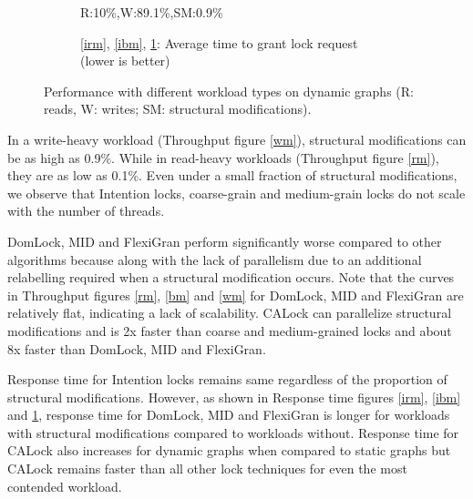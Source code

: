 \begin{figure}[h]
\begin{subfigure}[b]{.325\textwidth}
			\caption{R:10\%,W:89.1\%,SM:0.9\%}
			\label{iwm}
		\end{subfigure}
		\begin{subfigure}[b]{\textwidth}
			\caption*{\ref{irm}, \ref{ibm}, \ref{iwm}: Average time to grant lock request  (lower is better)}
		\end{subfigure}
	
		\caption{Performance with different workload types on dynamic graphs  (R: reads, W: writes; SM: structural modifications).}
		\label{dynamicPerf}
	\end{figure}

In a write-heavy workload (Throughput figure \ref{wm}), structural modifications can be as high as 0.9\%. 
While in read-heavy workloads (Throughput figure \ref{rm}), they are as low as 0.1\%.
Even under a small fraction of structural modifications, we observe that Intention locks, coarse-grain and medium-grain locks do not scale with the number of threads. 

	
DomLock, MID and FlexiGran perform significantly worse compared to other algorithms because along with the lack of parallelism due to an additional relabelling required when a structural modification occurs.
Note that the curves in Throughput figures \ref{rm}, \ref{bm} and \ref{wm} for DomLock, MID and FlexiGran are relatively flat, indicating a lack of scalability. CALock can parallelize structural modifications and is 2x faster than coarse and medium-grained locks and about 8x faster than DomLock, MID and FlexiGran.

Response time for Intention locks remains same regardless of the proportion of structural modifications. However, as shown in Response time figures \ref{irm}, \ref{ibm} and \ref{iwm}, response time for DomLock, MID and FlexiGran is longer for workloads with structural modifications compared to workloads without.
Response time for CALock also increases for dynamic graphs when compared to static graphs but CALock remains faster than all other lock techniques for even the most contended workload.



